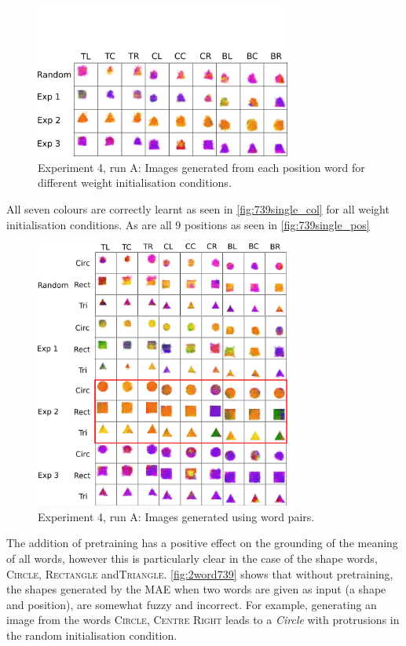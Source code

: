 \begin{figure}[h]
\centering
\includegraphics[width=0.75\textwidth]{Figs/shapes/singlelabel739_pos.png}
\caption{Experiment 4, run A: Images generated from each position word for different weight initialisation conditions.}
\label{fig:739single_pos}
\end{figure}

All seven colours are correctly learnt as seen in \autoref{fig:739single_col} for all weight initialisation conditions. As are all 9 positions as seen in \autoref{fig:739single_pos}




\begin{figure}[h!]
\centering
\includegraphics[width=0.75\textwidth]{Figs/shapes/2word739_pos.png}
\caption{Experiment 4, run A: Images generated using word pairs.}
\label{fig:2word739}
\end{figure}

The addition of pretraining has a positive effect on the grounding of the meaning of all words, however this is particularly clear in the case of the shape words, \textsc{Circle}, \textsc{Rectangle} and\textsc{Triangle}. \autoref{fig:2word739} shows that without pretraining, the shapes generated by the \ac{MAE} when two words are given as input (a shape and position), are somewhat fuzzy and incorrect. For example, generating an image from the words \textsc{Circle, Centre Right} leads to a \textit{Circle} with protrusions in the random initialisation condition.

